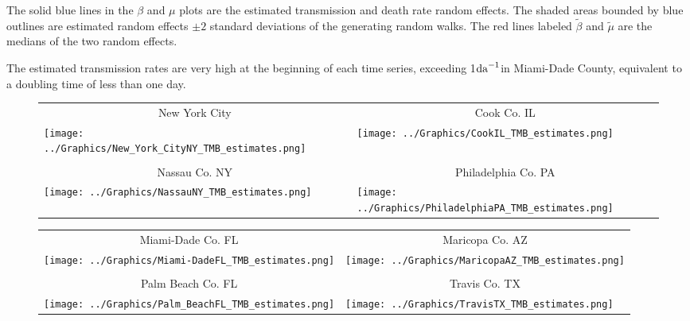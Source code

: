 \documentclass[12pt,letterpaper]{article}
\newcommand\perda{$\rm{da}^{-1}$}
\begin{document}
The solid blue lines in the $\beta$ and $\mu$ plots are the estimated
transmission and death rate random effects.
The shaded areas bounded by blue outlines are
estimated random effects $\pm 2$ standard deviations of the generating
random walks.
The red lines labeled $\tilde{\beta}$ and $\tilde{\mu}$ are the
medians of the two random effects.

The estimated transmission rates are very high
at the beginning of each time series, exceeding 1\perda in Miami-Dade
County, equivalent to a doubling time of less than one day.


\begin{figure}
{\scriptsize
\begin{center}
\begin{tabular}{ll}
\multicolumn{1}{c}{New York City}&\multicolumn{1}{c}{Cook Co. IL}\\
\texttt{[image: ../Graphics/New\_York\_CityNY\_TMB\_estimates.png]}&
\texttt{[image: ../Graphics/CookIL\_TMB\_estimates.png]}\\
\\
\multicolumn{1}{c}{Nassau Co. NY}&\multicolumn{1}{c}{Philadelphia Co.  PA}\\
\texttt{[image: ../Graphics/NassauNY\_TMB\_estimates.png]}&
\texttt{[image: ../Graphics/PhiladelphiaPA\_TMB\_estimates.png]}\\
\end{tabular}
\end{center}
}
\caption{\label{fig:ests1}
}
\end{figure}

\begin{figure}
{\scriptsize
\begin{center}
\begin{tabular}{ll}
\multicolumn{1}{c}{Miami-Dade Co. FL}&\multicolumn{1}{c}{Maricopa Co. AZ}\\
\texttt{[image: ../Graphics/Miami-DadeFL\_TMB\_estimates.png]}&
\texttt{[image: ../Graphics/MaricopaAZ\_TMB\_estimates.png]}\\
\\
\multicolumn{1}{c}{Palm Beach Co. FL}&\multicolumn{1}{c}{Travis Co. TX}\\
\texttt{[image: ../Graphics/Palm\_BeachFL\_TMB\_estimates.png]}&
\texttt{[image: ../Graphics/TravisTX\_TMB\_estimates.png]}\\
\end{tabular}
\end{center}
}
\caption{\label{fig:ests2}
}
\end{figure}
\end{document}
